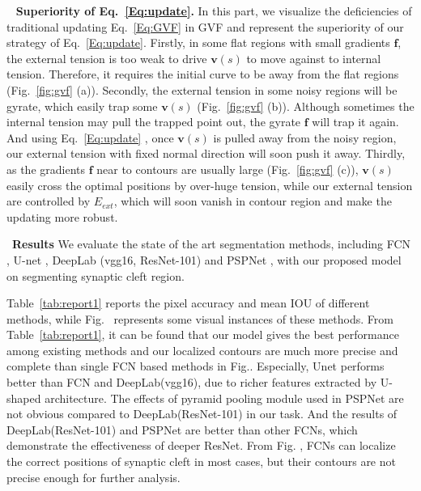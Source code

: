 ~ \noindent\textbf{Superiority of Eq.~\ref{Eq:update}.}
In this part, we visualize the deficiencies of traditional updating Eq.~\ref{Eq:GVF} in GVF and represent the superiority of our strategy of Eq.~\ref{Eq:update}.
Firstly, in some flat regions with small gradients $\mathbf{f}$, the external tension is too weak to drive $\mathbf{v}(s)$ to move against to internal tension.
Therefore, it requires the initial curve to be away from the flat regions (Fig.~\ref{fig:gvf} (a)).
Secondly, the external tension in some noisy regions will be gyrate, which easily trap some $\mathbf{v}(s)$ (Fig.~\ref{fig:gvf} (b)).
Although sometimes the internal tension may pull the trapped point out, the gyrate $\mathbf{f}$ will trap it again.
And using Eq.~\ref{Eq:update} , once $\mathbf{v}(s)$ is pulled away from the noisy region, our external tension with fixed normal direction will soon push it away.
Thirdly, as the gradients $\mathbf{f}$ near to contours are usually large (Fig.~\ref{fig:gvf} (c)), $\mathbf{v}(s)$ easily cross the optimal positions by over-huge tension, while our external tension are controlled by $E_{ext}$, which will soon vanish in contour region and make the updating more robust.

~\noindent\textbf{Results}
We evaluate the state of the art segmentation methods, including FCN \cite{Long2015}, U-net \cite{Ronneberger2015}, DeepLab (vgg16, ResNet-101) \cite{Chen2016a} and PSPNet \cite{Zhao2016}, with our proposed model on segmenting synaptic cleft region.

Table~\ref{tab:report1} reports the pixel accuracy and mean IOU of different methods, while Fig.~ represents some visual instances of these methods.
From Table~\ref{tab:report1}, it can be found that our model gives the best performance among existing methods and our localized contours are much more precise and complete than single FCN based methods in Fig..
Especially, Unet performs better than FCN and DeepLab(vgg16), due to richer features extracted by U-shaped architecture.
The effects of pyramid pooling module used in PSPNet are not obvious compared to DeepLab(ResNet-101) in our task.
And the results of DeepLab(ResNet-101) and PSPNet are better than other FCNs, which demonstrate the effectiveness of deeper ResNet.
From Fig. , FCNs can localize the correct positions of synaptic cleft in most cases, but their contours are not precise enough for further analysis.

